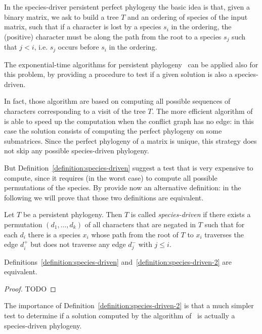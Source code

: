 In the species-driver persistent perfect phylogeny the basic idea is that, given  a binary matrix, we ask to build a tree  $T$ and an ordering of species  of the input matrix, such that if a character is lost by a species $s_i$ in the ordering, the (positive) character must be along the path from the root to a species $s_j$ such that $j < i$, i.e. $s_j$ occurs before $s_i$ in the ordering.

The exponential-time algorithms for persistent
phylogeny~\cite{DBLP:journals-tcs-BonizzoniBDT12,bonizzoni_explaining_2014}
can be applied also for this problem, by providing a procedure to test
if a given solution is also a species-driven.

In fact, those algorithm are based on computing all possible sequences
of characters corresponding to a visit of the tree $T$.
The more efficient algorithm of~\cite{bonizzoni_explaining_2014} is
able to speed up the computation when the conflict graph has no edge:
in this case the solution consists of computing the perfect phylogeny
on some submatrices.
Since the perfect phylogeny of a matrix is unique, this strategy does
not skip any possible species-driven phylogeny.

But Definition~\ref{definition:species-driven} suggest a test that is
very expensive to compute, since it requires (in the worst case) to
compute all possible permutations of the species.
By provide now an alternative definition: in the following we will
prove that those two definitions are equivalent.


\begin{definition}
\label{definition:species-driven-2}
Let $T$ be a persistent phylogeny.
Then $T$ is called \emph{species-driven} if there exists a permutation
$(d_{1}, \ldots , d_{k})$ of all characters that are negated in $T$
such that for each $d_{i}$ there is a species $x_{i}$ whose path from
the root of $T$ to $x_{i}$ traverses the edge $d_{i}^{+}$ but does not
traverse any edge $d_{j}^{-}$ with $j \le i$.
\end{definition}

\begin{lemma}
\label{lemma:equivalent-species-driven}
Definitions~\ref{definition:species-driven}
and~\ref{definition:species-driven-2} are equivalent.
\end{lemma}

\begin{proof}
TODO
\end{proof}

The importance of Definition~\ref{definition:species-driven-2} is that
a much simpler test to determine if a solution computed by the
algorithm of~\cite{bonizzoni_explaining_2014} is actually a
species-driven phylogeny.

